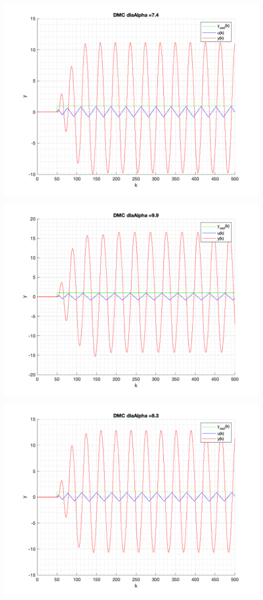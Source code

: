\documentclass[a4paper, 11pt]{article}
\begin{document}
\begin{enumerate}
 \includegraphics[width=\linewidth]{./ModelsDodatkowe_Alpha/P4_DMC_Alpha_7_4_png.png} 
 
 \includegraphics[width=\linewidth]{./ModelsDodatkowe_Alpha/P4_DMC_Alpha_9_9_png.png} 
 
 \includegraphics[width=\linewidth]{./ModelsDodatkowe_Alpha/P4_DMC_Alpha_8_3_png.png} 
 

\end{enumerate}
\end{document}
